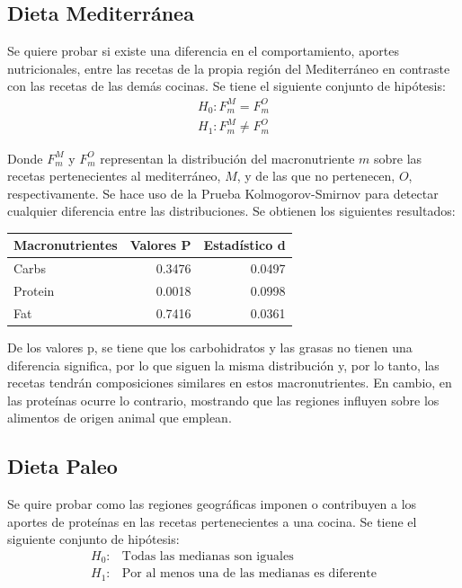 \documentclass[12pt,a4paper]{article}
\begin{document}
{        \subsection{Dieta Mediterránea}

        {
            Se quiere probar si existe una diferencia en el comportamiento, aportes 
            nutricionales, entre las recetas de la propia región del Mediterráneo en contraste 
            con las recetas de las demás cocinas. Se tiene el siguiente conjunto de hipótesis:
            \begin{align*}
                H_0 : F^M_m = F^O_m \\
                H_1 : F^M_m \ne F^O_m  
            \end{align*}

            Donde $F^M_m$ y $F^O_m$ representan la distribución del macronutriente $m$ sobre las 
            recetas pertenecientes al mediterráneo, $M$, y de las que no pertenecen, $O$, respectivamente. 
            Se hace uso de la Prueba Kolmogorov-Smirnov para detectar cualquier diferencia entre las distribuciones.
            Se obtienen los siguientes resultados:

            \begin{center}
                \begin{tabular}{lrr}
                \toprule
                    Macronutrientes & Valores P & Estadístico d \\
                \midrule
                    Carbs   & 0.3476 & 0.0497 \\
                    Protein & 0.0018 & 0.0998 \\
                    Fat     & 0.7416 & 0.0361 \\
                \bottomrule
                \end{tabular}
            \end{center}
            
            De los valores p, se tiene que los carbohidratos y las grasas 
            no tienen una diferencia significa, por lo que siguen la misma 
            distribución y, por lo tanto, las recetas tendrán composiciones 
            similares en estos macronutrientes. En cambio, en las proteínas 
            ocurre lo contrario, mostrando que las regiones influyen sobre 
            los alimentos de origen animal que emplean.
        }

        \subsection{Dieta Paleo}
        {
            Se quire probar como las regiones geográficas imponen o contribuyen 
            a los aportes de proteínas en las recetas pertenecientes a una cocina. 
            Se tiene el siguiente conjunto de hipótesis:
            \begin{align*}
                H_0 :& \text{Todas las medianas son iguales} \\
                H_1 :& \text{Por al menos una de las medianas es diferente}
            \end{align*}

}}
\end{document}
